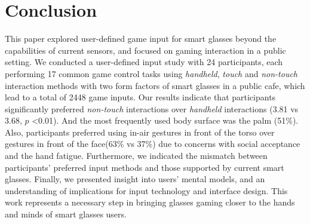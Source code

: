 \section{Conclusion}

This paper explored user-defined game input for smart glasses beyond the capabilities of current sensors, and focused on gaming interaction in a public setting. We conducted a user-defined input study with 24 participants, each performing 17 common game control tasks using \emph{handheld}, \emph{touch} and \emph{non-touch} interaction methods with two form factors of smart glasses in a public cafe, which lead to a total of 2448 game inputs. Our results indicate that participants significantly preferred \emph{non-touch} interactions over \emph{handheld} interactions (3.81 vs 3.68, $p$ \textless 0.01). And the most frequently used body surface was the palm (51\%). Also, participants preferred using in-air gestures in front of the torso over gestures in front of the face(63\% vs 37\%) due to concerns with social acceptance and the hand fatigue. Furthermore, we indicated the mismatch between participants' preferred input methods and those supported by current smart glasses. Finally, we presented insight into users' mental models, and an understanding of implications for input technology and interface design. This work represents a necessary step in bringing glasses gaming closer to the hands and minds of smart glasses users.